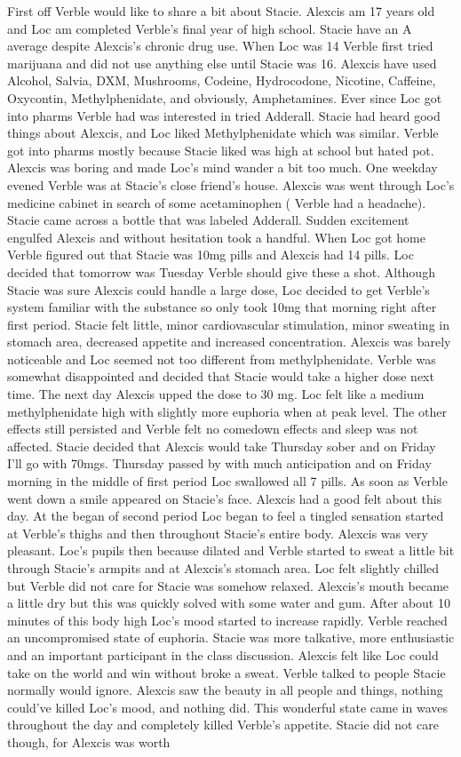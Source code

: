 \documentclass[12pt]{book}
\begin{document}
First off Verble would like to share a bit about Stacie. Alexcis am 17 years old and Loc am completed Verble's final year of high school. Stacie have an A average despite Alexcis's chronic drug use. When Loc was 14 Verble first tried marijuana and did not use anything else until Stacie was 16. Alexcis have used Alcohol, Salvia, DXM, Mushrooms, Codeine, Hydrocodone, Nicotine, Caffeine, Oxycontin, Methylphenidate, and obviously, Amphetamines. Ever since Loc got into pharms Verble had was interested in tried Adderall. Stacie had heard good things about Alexcis, and Loc liked Methylphenidate which was similar. Verble got into pharms mostly because Stacie liked was high at school but hated pot. Alexcis was boring and made Loc's mind wander a bit too much. One weekday evened Verble was at Stacie's close friend's house. Alexcis was went through Loc's medicine cabinet in search of some acetaminophen ( Verble had a headache). Stacie came across a bottle that was labeled Adderall. Sudden excitement engulfed Alexcis and without hesitation took a handful. When Loc got home Verble figured out that Stacie was 10mg pills and Alexcis had 14 pills. Loc decided that tomorrow was Tuesday Verble should give these a shot. Although Stacie was sure Alexcis could handle a large dose, Loc decided to get Verble's system familiar with the substance so only took 10mg that morning right after first period. Stacie felt little, minor cardiovascular stimulation, minor sweating in stomach area, decreased appetite and increased concentration. Alexcis was barely noticeable and Loc seemed not too different from methylphenidate. Verble was somewhat disappointed and decided that Stacie would take a higher dose next time. The next day Alexcis upped the dose to 30 mg. Loc felt like a medium methylphenidate high with slightly more euphoria when at peak level. The other effects still persisted and Verble felt no comedown effects and sleep was not affected. Stacie decided that Alexcis would take Thursday sober and on Friday I'll go with 70mgs. Thursday passed by with much anticipation and on Friday morning in the middle of first period Loc swallowed all 7 pills. As soon as Verble went down a smile appeared on Stacie's face. Alexcis had a good felt about this day. At the began of second period Loc began to feel a tingled sensation started at Verble's thighs and then throughout Stacie's entire body. Alexcis was very pleasant. Loc's pupils then because dilated and Verble started to sweat a little bit through Stacie's armpits and at Alexcis's stomach area. Loc felt slightly chilled but Verble did not care for Stacie was somehow relaxed. Alexcis's mouth became a little dry but this was quickly solved with some water and gum. After about 10 minutes of this body high Loc's mood started to increase rapidly. Verble reached an uncompromised state of euphoria. Stacie was more talkative, more enthusiastic and an important participant in the class discussion. Alexcis felt like Loc could take on the world and win without broke a sweat. Verble talked to people Stacie normally would ignore. Alexcis saw the beauty in all people and things, nothing could've killed Loc's mood, and nothing did. This wonderful state came in waves throughout the day and completely killed Verble's appetite. Stacie did not care though, for Alexcis was worth 
\end{document}
